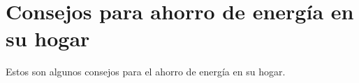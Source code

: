 \section{Consejos para ahorro de energía en su hogar}\label{ahorro}
Estos son algunos consejos para el ahorro de energía en su hogar. 
